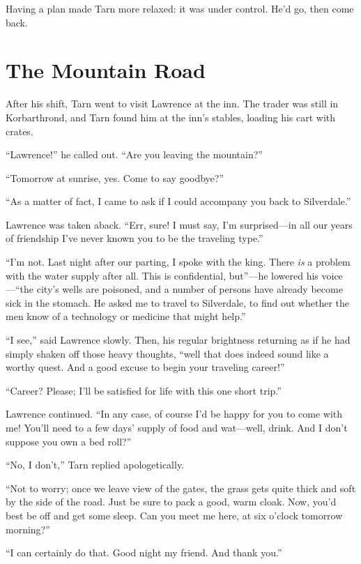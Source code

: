 Having a plan made Tarn more relaxed: it was under control.  He'd go, then come back.

\chapter{The Mountain Road}

After his shift, Tarn went to visit Lawrence at the inn.  The trader was still in Korbarthrond, and Tarn found him at the inn's stables, loading his cart with crates.

``Lawrence!'' he called out.  ``Are you leaving the mountain?''

``Tomorrow at sunrise, yes.  Come to say goodbye?''

``As a matter of fact, I came to ask if I could accompany you back to Silverdale.''

Lawrence was taken aback.  ``Err, sure!  I must say, I'm surprised---in all our years of friendship I've never known you to be the traveling type.''

``I'm not.  Last night after our parting, I spoke with the king.  There \emph{is} a problem with the water supply after all.  This is confidential, but''---he lowered his voice---``the city's wells are poisoned, and a number of persons have already become sick in the stomach.  He asked me to travel to Silverdale, to find out whether the men know of a technology or medicine that might help.''

``I see,'' said Lawrence slowly.  Then, his regular brightness returning as if he had simply shaken off those heavy thoughts, ``well that does indeed sound like a worthy quest.  And a good excuse to begin your traveling career!''

``Career?  Please; I'll be satisfied for life with this one short trip.''

Lawrence continued.  ``In any case, of course I'd be happy for you to come with me!  You'll need to a few days' supply of food and wat---well, drink.  And I don't suppose you own a bed roll?''

``No, I don't,'' Tarn replied apologetically.

``Not to worry; once we leave view of the gates, the grass gets quite thick and soft by the side of the road.  Just be sure to pack a good, warm cloak.  Now, you'd best be off and get some sleep.  Can you meet me here, at six o'clock tomorrow morning?''

``I can certainly do that.  Good night my friend.  And thank you.''

